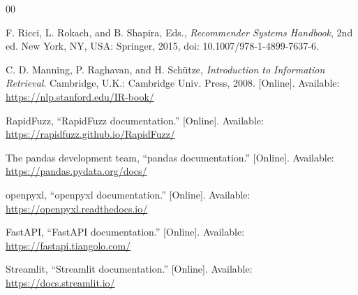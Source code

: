 \documentclass[conference]{IEEEtran}
\begin{document}
\begin{thebibliography}{00}

F. Ricci, L. Rokach, and B. Shapira, Eds., \textit{Recommender Systems Handbook}, 2nd ed. New York, NY, USA: Springer, 2015, doi: 10.1007/978-1-4899-7637-6.

C. D. Manning, P. Raghavan, and H. Sch\"utze, \textit{Introduction to Information Retrieval}. Cambridge, U.K.: Cambridge Univ. Press, 2008. [Online]. Available: \url{https://nlp.stanford.edu/IR-book/}

RapidFuzz, ``RapidFuzz documentation.'' [Online]. Available: \url{https://rapidfuzz.github.io/RapidFuzz/}

The pandas development team, ``pandas documentation.'' [Online]. Available: \url{https://pandas.pydata.org/docs/}

openpyxl, ``openpyxl documentation.'' [Online]. Available: \url{https://openpyxl.readthedocs.io/}

FastAPI, ``FastAPI documentation.'' [Online]. Available: \url{https://fastapi.tiangolo.com/}

Streamlit, ``Streamlit documentation.'' [Online]. Available: \url{https://docs.streamlit.io/}

\end{thebibliography}
\end{document}
